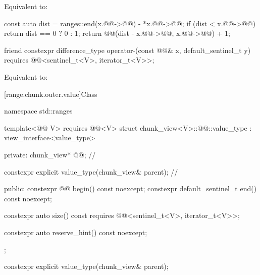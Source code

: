 \begin{itemdescr}
\pnum
\effects
Equivalent to:
\begin{codeblock}
const auto dist = ranges::end(x.@@->@@) - *x.@@->@@;
if (dist < x.@@->@@) {
  return dist == 0 ? 0 : 1;
}
return @@(dist - x.@@->@@, x.@@->@@) + 1;
\end{codeblock}
\end{itemdescr}

%
\begin{itemdecl}
friend constexpr difference_type operator-(const @@& x, default_sentinel_t y)
  requires @@<sentinel_t<V>, iterator_t<V>>;
\end{itemdecl}

\begin{itemdescr}
\pnum
\effects
Equivalent to: 
\end{itemdescr}

[range.chunk.outer.value]{Class }

%
\begin{codeblock}
namespace std::ranges {
  template<@@ V>
    requires @@<V>
  struct chunk_view<V>::@@::value_type : view_interface<value_type> {
  private:
    chunk_view* @@;                                        // \expos

    constexpr explicit value_type(chunk_view& parent);          // \expos

  public:
    constexpr @@ begin() const noexcept;
    constexpr default_sentinel_t end() const noexcept;

    constexpr auto size() const
      requires @@<sentinel_t<V>, iterator_t<V>>;

    constexpr auto reserve_hint() const noexcept;
  };
}
\end{codeblock}

%
\begin{itemdecl}
constexpr explicit value_type(chunk_view& parent);
\end{itemdecl}

